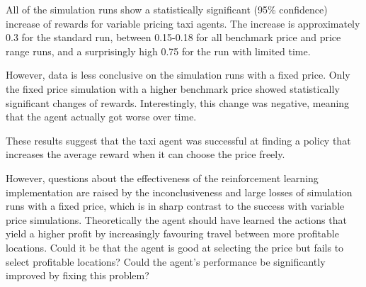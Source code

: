 All of the simulation runs show a statistically significant (95\% confidence)
increase of rewards for variable pricing taxi agents. The increase is
approximately 0.3 for the standard run, between 0.15-0.18 for all benchmark
price and price range runs, and a surprisingly high 0.75 for the run with
limited time.

However, data is less conclusive on the simulation runs with a fixed price.
Only the fixed price simulation with a higher benchmark price showed
statistically significant changes of rewards. Interestingly, this change was
negative, meaning that the agent actually got worse over time.

These results suggest that the taxi agent was successful at finding a policy
that increases the average reward when it can choose the price freely. 

However, questions about the effectiveness of the reinforcement learning
implementation are raised by the inconclusiveness and large losses of simulation
runs with a fixed price, which is in sharp contrast to the success with
variable price simulations. Theoretically the agent should have learned the
actions that yield a higher profit by increasingly favouring travel between
more profitable locations. Could it be that the agent is good at selecting the
price but fails to select profitable locations? Could the agent's performance
be significantly improved by fixing this problem?
